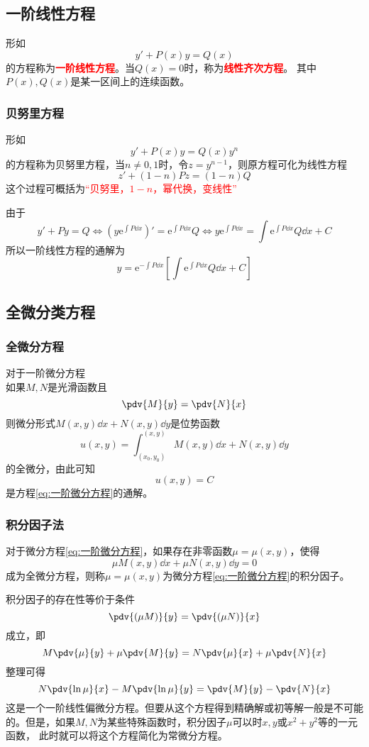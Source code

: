 \subsection{一阶线性方程}
形如\[ y' + P(x)y = Q(x) \]的方程称为\textcolor{red}{\textbf{\textsf{一阶线性方程}}}。当$Q(x)=0$时，称为\textcolor{red}{\textbf{\textsf{线性齐次方程}}}。
其中$P(x),Q(x)$是某一区间上的连续函数。

\subsubsection{贝努里方程}
形如
\[ y' + P(x)y = Q(x)y^n \]
的方程称为贝努里方程，当$n\neq 0,1$时，令$z=y^{n-1}$，则原方程可化为线性方程
\[ z' + (1-n)Pz = (1-n)Q \]
这个过程可概括为\textcolor{red}{“贝努里，$1-n$，幂代换，变线性”}

由于
\[ y' + Py = Q \iff (y\mathrm{e}^{\int P\dd{x}})' = \mathrm{e}^{\int P\dd{x}}Q \iff y\mathrm{e}^{\int P\dd{x}} = \int \mathrm{e}^{\int P\dd{x}}Q\dd{x} + C \]
所以一阶线性方程的通解为
\[ y = \mathrm{e}^{-\int P\dd{x}}\left[\int \mathrm{e}^{\int P\dd{x}}Q \dd{x} +C \right] \]

\subsection{全微分类方程}
\subsubsection{全微分方程}
对于一阶微分方程
\begin{equation}
    \label{eq:一阶微分方程}
\end{equation}
如果$M,N$是光滑函数且
\[ \pdv{M}{y} = \pdv{N}{x} \]
则微分形式$M(x,y)\dd{x} + N(x,y)\dd{y}$是位势函数
\[ u(x,y) = \int_{(x_0,y_0)}^{(x,y)} M(x,y)\dd{x} + N(x,y)\dd{y} \]
的全微分，由此可知
\[ u(x,y) = C \]
是方程\ref{eq:一阶微分方程}的通解。

\subsubsection{积分因子法}
对于微分方程\ref{eq:一阶微分方程}，如果存在非零函数$\mu=\mu(x,y)$，使得
\[ \mu M(x,y)\dd{x} + \mu N(x,y)\dd{y} = 0 \]
成为全微分方程，则称$\mu=\mu(x,y)$为微分方程\ref{eq:一阶微分方程}的积分因子。

积分因子的存在性等价于条件
\[ \pdv{(\mu M)}{y} = \pdv{(\mu N)}{x} \]
成立，即
\[ M\pdv{\mu}{y} + \mu\pdv{M}{y} = N\pdv{\mu}{x} + \mu\pdv{N}{x} \]
整理可得
\begin{equation}
    \label{eq:积分因子法}
    N\pdv{\ln\mu}{x} - M\pdv{\ln\mu}{y} = \pdv{M}{y} - \pdv{N}{x}
\end{equation}
这是一个一阶线性偏微分方程。但要从这个方程得到精确解或初等解一般是不可能的。但是，如果$M,N$为某些特殊函数时，积分因子$\mu$可以时$x,y$或$x^2+y^2$等的一元函数，
此时就可以将这个方程简化为常微分方程。

